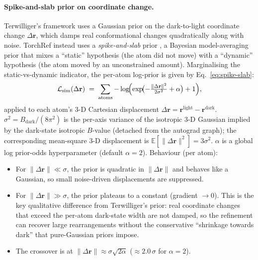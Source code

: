 \documentclass{iucrjournals}
\begin{document}
\paragraph{Spike-and-slab prior on coordinate change.}
Terwilliger's framework uses a Gaussian prior on the dark-to-light
coordinate change $\Delta\mathbf{r}$, which damps real conformational
changes quadratically along with noise.  TorchRef instead uses a
\emph{spike-and-slab} prior \cite{mitchell_beauchamp_1988}, a Bayesian
model-averaging prior that mixes a ``static'' hypothesis (the atom did
not move) with a ``dynamic'' hypothesis (the atom moved by an
unconstrained amount).  Marginalising the static-vs-dynamic indicator,
the per-atom log-prior is given by Eq.~\ref{eq:spike-slab}:
%
\begin{equation}
  \mathcal{L}_\mathrm{sim}(\Delta\mathbf{r})
  \;=\; \sum_\mathrm{atoms}
    -\log\!\Bigl(
      \exp\!\bigl(-\tfrac{\lVert\Delta\mathbf{r}\rVert^{2}}{2\sigma^{2}} + \alpha\bigr) + 1
    \Bigr),
  \label{eq:spike-slab}
\end{equation}
%
applied to each atom's 3-D Cartesian displacement
$\Delta\mathbf{r} = \mathbf{r}^\mathrm{light} - \mathbf{r}^\mathrm{dark}$.
$\sigma^{2} = B_\mathrm{dark}/(8\pi^{2})$ is the per-axis variance of the
isotropic 3-D Gaussian implied by the dark-state isotropic $B$-value
(detached from the autograd graph); the corresponding mean-square 3-D
displacement is $\mathbb{E}[\lVert\Delta\mathbf{r}\rVert^{2}] = 3\sigma^{2}$.
$\alpha$ is a global log prior-odds hyperparameter (default $\alpha = 2$).
Behaviour (per atom):
%
\begin{itemize}
\item For $\lVert\Delta\mathbf{r}\rVert \ll \sigma$, the prior is quadratic in
  $\lVert\Delta\mathbf{r}\rVert$ and behaves like a Gaussian, so small
  noise-driven displacements are suppressed.
\item For $\lVert\Delta\mathbf{r}\rVert \gg \sigma$, the prior plateaus to a
  constant (gradient $\rightarrow 0$).  This is the key qualitative difference
  from Terwilliger's prior: real coordinate changes that exceed the per-atom
  dark-state width are not damped, so the refinement can recover large
  rearrangements without the conservative ``shrinkage towards dark'' that
  pure-Gaussian priors impose.
\item The crossover is at $\lVert\Delta\mathbf{r}\rVert \approx \sigma\sqrt{2\alpha}$
  ($\approx 2.0\,\sigma$ for $\alpha = 2$).
\end{itemize}
\end{document}
